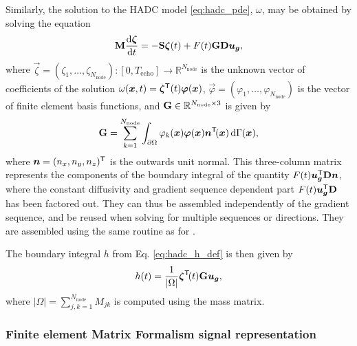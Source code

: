 \documentclass[a4paper]{article}
\begin{document}
Similarly, the solution to the HADC model \eqref{eq:hadc_pde}, $\omega$, may be obtained by solving the equation
\begin{equation}
    \mathbf{M} \frac{\mathrm{d} \bm{\zeta}}{\mathrm{d} t} = - \mathbf{S} \bm{\zeta}(t) + F(t) \mathbf{G} \mathbf{D} \bm{u}_{\bm{g}},
\end{equation}
where $\vec{\zeta} = (\zeta_1, \dots, \zeta_{N_\text{node}}) : [0, T_\text{echo}] \to \mathbb{R}^{N_\text{node}}$ is the unknown vector of coefficients of the solution $\omega(\bm{x}, t) = \bm{\zeta}^{\mathsf{T}}(t) \bm{\varphi}(\bm{x})$, $\vec{\varphi} = (\varphi_1, \dots, \varphi_{N_\text{node}})$ is the vector of finite element basis functions, and $\mathbf{G} \in \mathbb{R}^{N_\text{node} \times 3}$ is given by
\begin{equation}
    \mathbf{G} = \sum_{k = 1}^{N_\text{node}} \int_{\partial \Omega}  \varphi_k(\bm{x}) \bm{\varphi}(\bm{x}) \bm{n}^{\mathsf{T}}\!(\bm{x})  \, \mathrm{d}\Gamma(\bm{x}),
\end{equation}
where $\bm{n} = (n_x, n_y, n_z)^{\mathsf{T}}$ is the outwards unit normal. This three-column matrix represents the components of the boundary integral of the quantity $F(t) \bm{u}_{\bm{g}}^{\mathsf{T}} \mathbf{D} \bm{n}$, where the constant diffusivity and gradient sequence dependent part $F(t) \bm{u}_{\bm{g}}^{\mathsf{T}} \mathbf{D}$ has been factored out. They can thus be assembled independently of the gradient sequence, and be reused when solving for multiple sequences or directions. They are assembled using the same routine as for .

The boundary integral $h$ from Eq. \eqref{eq:hadc_h_def} is then given by
\begin{equation}
    h(t) = \frac{1}{|\Omega|} \bm{\zeta}^{\mathsf{T}}\!(t) \mathbf{G} \bm{u}_{\bm{g}},
\end{equation}
where $|\Omega| = \sum_{j,k = 1}^{N_\text{node}} M_{jk}$ is computed using the mass matrix.


\subsubsection{Finite element Matrix Formalism signal representation}
\end{document}

